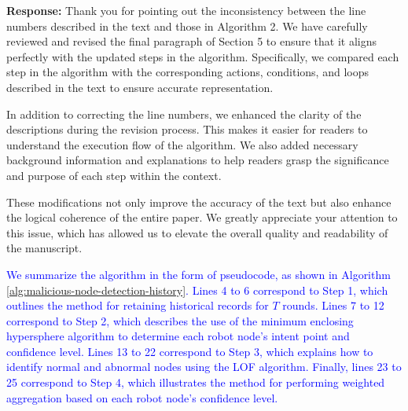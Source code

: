 \documentclass[a4paper,twoside,11pt,dvipsnames]{reviewresponse}
\begin{document}




\textbf{Response:} Thank you for pointing out the inconsistency between the line numbers described in the text and those in Algorithm 2. We have carefully reviewed and revised the final paragraph of Section 5 to ensure that it aligns perfectly with the updated steps in the algorithm. Specifically, we compared each step in the algorithm with the corresponding actions, conditions, and loops described in the text to ensure accurate representation.

In addition to correcting the line numbers, we enhanced the clarity of the descriptions during the revision process. This makes it easier for readers to understand the execution flow of the algorithm. We also added necessary background information and explanations to help readers grasp the significance and purpose of each step within the context.

These modifications not only improve the accuracy of the text but also enhance the logical coherence of the entire paper. We greatly appreciate your attention to this issue, which has allowed us to elevate the overall quality and readability of the manuscript.

\textcolor{blue}{We summarize the algorithm in the form of pseudocode, as shown in Algorithm \ref{alg:malicious-node-detection-history}. Lines 4 to 6 correspond to Step 1, which outlines the method for retaining historical records for \(T\) rounds. Lines 7 to 12 correspond to Step 2, which describes the use of the minimum enclosing hypersphere algorithm to determine each robot node's intent point and confidence level. Lines 13 to 22 correspond to Step 3, which explains how to identify normal and abnormal nodes using the LOF algorithm. Finally, lines 23 to 25 correspond to Step 4, which illustrates the method for performing weighted aggregation based on each robot node's confidence level.
}
\end{document}
